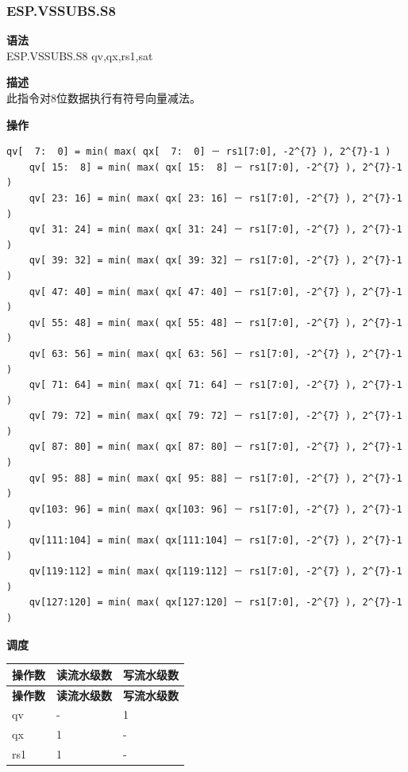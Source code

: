 \newpage

\newpage
\subsubsection{ESP.VSSUBS.S8}\label{instruction:ESPVSSUBSS8}
\textbf{语法}\\
ESP.VSSUBS.S8 qv,qx,rs1,sat

\textbf{描述}\\
此指令对8位数据执行有符号向量减法。

\textbf{操作}\\
\begin{lstlisting}[escapeinside=`?]
    qv[  7:  0] = min( max( qx[  7:  0] － rs1[7:0], -2^{7} ), 2^{7}-1 )
    qv[ 15:  8] = min( max( qx[ 15:  8] － rs1[7:0], -2^{7} ), 2^{7}-1 )
    qv[ 23: 16] = min( max( qx[ 23: 16] － rs1[7:0], -2^{7} ), 2^{7}-1 )
    qv[ 31: 24] = min( max( qx[ 31: 24] － rs1[7:0], -2^{7} ), 2^{7}-1 )
    qv[ 39: 32] = min( max( qx[ 39: 32] － rs1[7:0], -2^{7} ), 2^{7}-1 )
    qv[ 47: 40] = min( max( qx[ 47: 40] － rs1[7:0], -2^{7} ), 2^{7}-1 )
    qv[ 55: 48] = min( max( qx[ 55: 48] － rs1[7:0], -2^{7} ), 2^{7}-1 )
    qv[ 63: 56] = min( max( qx[ 63: 56] － rs1[7:0], -2^{7} ), 2^{7}-1 )
    qv[ 71: 64] = min( max( qx[ 71: 64] － rs1[7:0], -2^{7} ), 2^{7}-1 )
    qv[ 79: 72] = min( max( qx[ 79: 72] － rs1[7:0], -2^{7} ), 2^{7}-1 )
    qv[ 87: 80] = min( max( qx[ 87: 80] － rs1[7:0], -2^{7} ), 2^{7}-1 )
    qv[ 95: 88] = min( max( qx[ 95: 88] － rs1[7:0], -2^{7} ), 2^{7}-1 )
    qv[103: 96] = min( max( qx[103: 96] － rs1[7:0], -2^{7} ), 2^{7}-1 )
    qv[111:104] = min( max( qx[111:104] － rs1[7:0], -2^{7} ), 2^{7}-1 )
    qv[119:112] = min( max( qx[119:112] － rs1[7:0], -2^{7} ), 2^{7}-1 )
    qv[127:120] = min( max( qx[127:120] － rs1[7:0], -2^{7} ), 2^{7}-1 )
\end{lstlisting}


\textbf{调度}\\
\begin{longtable}[c]{|l|l|l|}
    \hline
    \rowcolor{lightgray}
    \textbf{操作数} & \textbf{读流水级数} & \textbf{写流水级数} \\\hline
    \endfirsthead
    \hline
    \rowcolor{lightgray}
     \textbf{操作数} & \textbf{读流水级数} & \textbf{写流水级数} \\\hline
    \endhead
    \hline
    \endfoot

  qv & - & 1 \\\hline
    qx & 1 & - \\\hline
    rs1 & 1 & -

\end{longtable}

